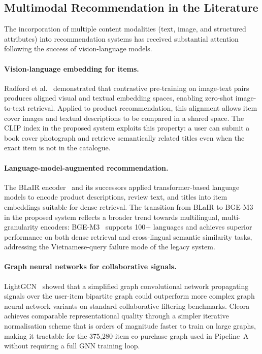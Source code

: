 \subsection{Multimodal Recommendation in the Literature}

The incorporation of multiple content modalities (text, image, and structured attributes) into recommendation systems has received substantial attention following the success of vision-language models.

\paragraph{Vision-language embedding for items.}
Radford et al.~\cite{radford2021clip} demonstrated that contrastive pre-training on image-text pairs produces aligned visual and textual embedding spaces, enabling zero-shot image-to-text retrieval.
Applied to product recommendation, this alignment allows item cover images and textual descriptions to be compared in a shared space.
The CLIP index in the proposed system exploits this property: a user can submit a book cover photograph and retrieve semantically related titles even when the exact item is not in the catalogue.

\paragraph{Language-model-augmented recommendation.}
The BLaIR encoder~\cite{hou2024blair} and its successors applied transformer-based language models to encode product descriptions, review text, and titles into item embeddings suitable for dense retrieval.
The transition from BLaIR to BGE-M3 in the proposed system reflects a broader trend towards multilingual, multi-granularity encoders: BGE-M3~\cite{chen2024bge} supports 100+ languages and achieves superior performance on both dense retrieval and cross-lingual semantic similarity tasks, addressing the Vietnamese-query failure mode of the legacy system.

\paragraph{Graph neural networks for collaborative signals.}
LightGCN~\cite{he2020lightgcn} showed that a simplified graph convolutional network propagating signals over the user-item bipartite graph could outperform more complex graph neural network variants on standard collaborative filtering benchmarks.
Cleora~\cite{rychalska2021cleora} achieves comparable representational quality through a simpler iterative normalisation scheme that is orders of magnitude faster to train on large graphs, making it tractable for the 375{,}280-item co-purchase graph used in Pipeline~A without requiring a full GNN training loop.

